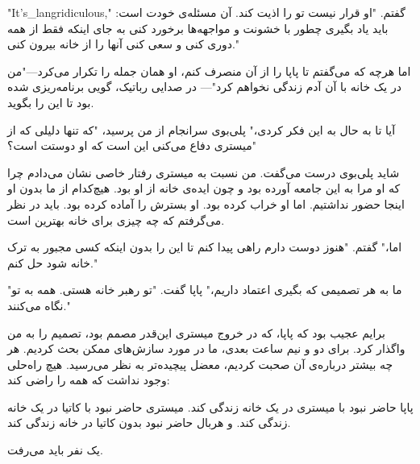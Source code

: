 "It's_langridiculous," گفتم. "او قرار نیست تو را اذیت کند. آن مسئله‌ی خودت است: باید یاد بگیری چطور با خشونت و مواجهه‌ها برخورد کنی به جای اینکه فقط از همه دوری کنی و سعی کنی آنها را از خانه بیرون کنی."

اما هرچه که می‌گفتم تا پاپا را از آن منصرف کنم، او همان جمله را تکرار می‌کرد—"من در یک خانه با آن آدم زندگی نخواهم کرد"— در صدایی رباتیک، گویی برنامه‌ریزی شده بود تا این را بگوید.

آیا تا به حال به این فکر کردی،" پلی‌بوی سرانجام از من پرسید، "که تنها دلیلی که از میستری دفاع می‌کنی این است که او دوستت است؟"

شاید پلی‌بوی درست می‌گفت. من نسبت به میستری رفتار خاصی نشان می‌دادم چرا که او مرا به این جامعه آورده بود و چون ایده‌ی خانه از او بود. هیچ‌کدام از ما بدون او اینجا حضور نداشتیم. اما او خراب کرده بود. او بسترش را آماده کرده بود. باید در نظر می‌گرفتم که چه چیزی برای خانه بهترین است.

اما،" گفتم. "هنوز دوست دارم راهی پیدا کنم تا این را بدون اینکه کسی مجبور به ترک خانه شود حل کنم."

"ما به هر تصمیمی که بگیری اعتماد داریم،" پاپا گفت. "تو رهبر خانه هستی. همه به تو نگاه می‌کنند."

برایم عجیب بود که پاپا، که در خروج میستری این‌قدر مصمم بود، تصمیم را به من واگذار کرد. برای دو و نیم ساعت بعدی، ما در مورد سازش‌های ممکن بحث کردیم. هر چه بیشتر درباره‌ی آن صحبت کردیم، معضل پیچیده‌تر به نظر می‌رسید. هیچ راه‌حلی وجود نداشت که همه را راضی کند:

پاپا حاضر نبود با میستری در یک خانه زندگی کند. 
میستری حاضر نبود با کاتیا در یک خانه زندگی کند.
و هربال حاضر نبود بدون کاتیا در خانه زندگی کند. 

یک نفر باید می‌رفت.